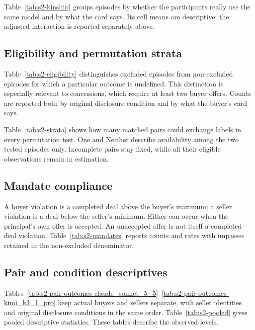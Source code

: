 Table~\ref{tab:s2-kinship} groups episodes by whether the participants really use the same model and by what the card says. Its cell means are descriptive; the adjusted interaction is reported separately above.



\subsection{Eligibility and permutation strata}
\label{subapp:eligibility-and-permutation-strata}
Table~\ref{tab:s2-eligibility} distinguishes excluded episodes from non-excluded episodes for which a particular outcome is undefined. This distinction is especially relevant to concessions, which require at least two buyer offers. Counts are reported both by original disclosure condition and by what the buyer's card says.


Table~\ref{tab:s2-strata} shows how many matched pairs could exchange labels in every permutation test. One and Neither describe availability among the two tested episodes only. Incomplete pairs stay fixed, while all their eligible observations remain in estimation.


\subsection{Mandate compliance}
\label{subapp:mandate-compliance}
A buyer violation is a completed deal above the buyer's maximum; a seller violation is a deal below the seller's minimum. Either can occur when the principal's own offer is accepted. An unaccepted offer is not itself a completed-deal violation. Table~\ref{tab:s2-mandates} reports counts and rates with impasses retained in the non-excluded denominator.


\subsection{Pair and condition descriptives}
\label{subapp:pair-and-condition-descriptives}
Tables~\ref{tab:s2-pair-outcomes-claude_sonnet_5_5}--\ref{tab:s2-pair-outcomes-kimi_k3_1_pro} keep actual buyers and sellers separate, with seller identities and original disclosure conditions in the same order. Table~\ref{tab:s2-pooled} gives pooled descriptive statistics. These tables describe the observed levels.

